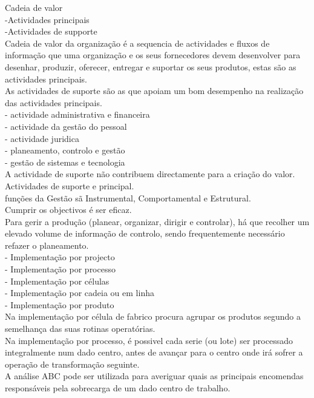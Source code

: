 Cadeia de valor\\
-Actividades principais\\
-Actividades de supporte\\

Cadeia de valor da organização é a sequencia de actividades e fluxos de informação que uma organização e os seus fornecedores devem desenvolver para desenhar, produzir, oferecer, entregar e suportar os seus produtos, estas são as actividades principais.\\

As actividades de suporte são as que apoiam um bom desempenho na realização das actividades principais.\\
- actividade administrativa e financeira\\
- actividade da gestão do pessoal\\
- actividade juridica\\
- planeamento, controlo e gestão\\
- gestão de sistemas e tecnologia\\

A actividade de suporte não contribuem directamente para a criação do valor.\\


Actividades de suporte e principal.\\
funções da Gestão sã Instrumental, Comportamental e Estrutural.\\

Cumprir os objectivos é ser eficaz.\\

Para gerir a produção (planear, organizar, dirigir e controlar), há que recolher um elevado volume de informação de controlo, sendo frequentemente necessário refazer o planeamento.\\

- Implementação por projecto\\
- Implementação por processo\\
- Implementação por células\\
- Implementação por cadeia ou em linha\\
- Implementação por produto\\

Na implementação por célula de fabrico procura agrupar os produtos segundo a semelhança das suas rotinas operatórias.\\
Na implementação por processo, é possivel cada serie (ou lote) ser processado integralmente num dado centro, antes de avançar para o centro onde irá sofrer a operação de transformação seguinte.\\
A análise ABC pode ser utilizada para averiguar quais as principais encomendas responsáveis pela sobrecarga de um dado centro de trabalho.\\

